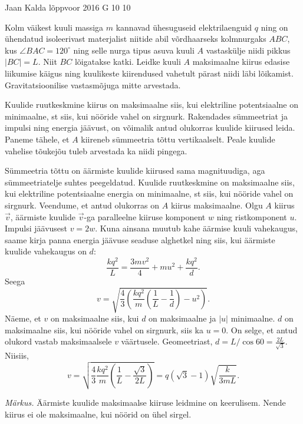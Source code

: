{Jaan Kalda} %
{lõppvoor} %
{2016} %
{G 10} %
{10} %
{
\ifStatement
Kolm väikest kuuli massiga $m$ kannavad ühesuguseid elektrilaenguid $q$ ning on ühendatud isoleerivast materjalist niitide abil võrdhaarseks kolmnurgaks $ABC$, kus $\angle BAC=120^\circ$ ning selle nurga tipus asuva kuuli $A$ vastaskülje niidi pikkus $|BC|=L$. Niit $BC$ lõigatakse katki. Leidke \osa kuuli $A$ maksimaalne kiirus edasise liikumise käigus ning \osa kuulikeste kiirendused vahetult pärast niidi läbi lõikamist. Gravitatsioonilise vastasmõjuga mitte arvestada.
\fi


\ifHint
\osa Kuulide ruutkeskmine kiirus on maksimaalne siis, kui elektriline potentsiaalne on minimaalne, st siis, kui nööride vahel on sirgnurk. Rakendades sümmeetriat ja impulsi ning energia jäävust, on võimalik antud olukorras kuulide kiirused leida.\\
\osa Paneme tähele, et $A$ kiireneb sümmeetria tõttu vertikaalselt. Peale kuulide vahelise tõukejõu tuleb arvestada ka niidi pingega.
\fi


\ifSolution
\osa Sümmeetria tõttu on äärmiste kuulide kiirused sama magnituudiga, aga sümmeetriatelje suhtes peegeldatud.
Kuulide ruutkeskmine on maksimaalne siis, kui elektriline potentsiaalne energia on minimaalne, st siis, kui nööride vahel on sirgnurk. Veendume, et antud olukorras on $A$ kiirus maksimaalne. Olgu $A$ kiirus $\vec v$, äärmiste kuulide $\vec v$-ga paralleelne kiiruse komponent $w$ ning ristkomponent $u$. Impulsi jäävusest $v = 2w$.
Kuna ainsana muutub kahe äärmise kuuli vahekaugus, saame kirja panna energia jäävuse seaduse alghetkel ning siis, kui äärmiste kuulide vahekaugus on $d$:
\[
\frac{kq^2}{L} = \frac{3mv^2}{4} + mu^2 + \frac{kq^2}{d}.
\]
Seega
\[
v = \sqrt{\frac{4}{3}\left(\frac{kq^2}{m}\left(\frac{1}{L} - \frac{1}{d}\right) - u^2\right)}.
\]
Näeme, et $v$ on maksimaalne siis, kui $d$ on maksimaalne ja $|u|$ minimaalne. $d$ on maksimaalne siis, kui nööride vahel on sirgnurk, siis ka $u = 0$. On selge, et antud olukord vastab maksimaalsele $v$ väärtusele. Geomeetriast, $d = L/\cos 60 = \frac{2L}{\sqrt 3}$. Niisiis,
\[
v = \sqrt{\frac{4}{3}\frac{kq^2}{m}\left(\frac{1}{L}-\frac{\sqrt{3}}{2L}\right)} = q\left(\sqrt{3} - 1\right)\sqrt{\frac{k}{3mL}}.
\]

\emph{Märkus.} Äärmiste kuulide maksimaalse kiiruse leidmine on keerulisem. Nende kiirus ei ole maksimaalne, kui nöörid on ühel sirgel.

}
